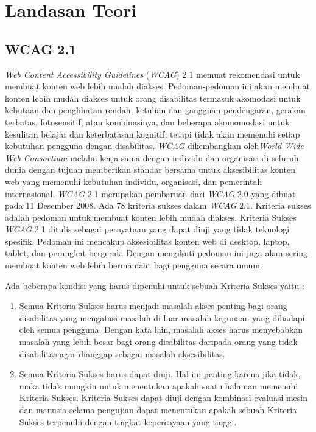 \chapter{Landasan Teori}
\label{chap:teori}


\section{WCAG 2.1}
\label{sec:WCAG2.1} 
\textit{Web Content Accessibility Guidelines} (\textit{WCAG}) 2.1 memuat rekomendasi untuk membuat konten web lebih mudah diakses. Pedoman-pedoman ini akan membuat konten lebih mudah diakses untuk orang disabilitas termasuk akomodasi untuk kebutaan dan penglihatan rendah, ketulian dan gangguan pendengaran, gerakan terbatas, fotosensitif, atau kombinasinya, dan beberapa akomomodasi untuk kesulitan belajar dan keterbatasan kognitif; tetapi tidak akan memenuhi setiap kebutuhan pengguna dengan disabilitas. \textit{WCAG} dikembangkan oleh\textit{World Wide Web Consortium} melalui kerja sama dengan individu dan organisasi di seluruh dunia dengan tujuan memberikan standar bersama untuk aksesibilitas konten web yang memenuhi kebutuhan individu, organisasi, dan pemerintah internasional. \textit{WCAG} 2.1 merupakan pembaruan dari \textit{WCAG} 2.0 yang dibuat pada 11 Desember 2008. Ada 78 kriteria sukses dalam \textit{WCAG} 2.1. Kriteria sukses adalah pedoman untuk membuat konten lebih mudah diakses. Kriteria Sukses \textit{WCAG} 2.1 ditulis sebagai pernyataan yang dapat diuji yang tidak teknologi spesifik. Pedoman ini mencakup aksesibilitas konten web di desktop, laptop, tablet, dan perangkat bergerak. Dengan mengikuti pedoman ini juga akan sering membuat konten web lebih bermanfaat bagi pengguna secara umum.

Ada beberapa kondisi yang harus dipenuhi untuk sebuah Kriteria Sukses yaitu :

\begin{enumerate}
	\item Semua Kriteria Sukses harus menjadi masalah akses penting bagi orang disabilitas yang mengatasi masalah di luar masalah kegunaan yang dihadapi oleh semua pengguna. Dengan kata lain, masalah akses harus menyebabkan masalah yang lebih besar bagi orang disabilitas daripada orang yang tidak disabilitas agar dianggap sebagai masalah aksesibilitas.
	\item Semua Kriteria Sukses harus dapat diuji. Hal ini penting karena jika tidak, maka tidak mungkin untuk menentukan apakah suatu halaman memenuhi Kriteria Sukses. Kriteria Sukses dapat diuji dengan kombinasi evaluasi mesin dan manusia selama pengujian dapat menentukan apakah sebuah Kriteria Sukses terpenuhi dengan tingkat kepercayaan yang tinggi.
\end{enumerate}


